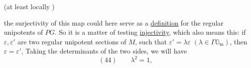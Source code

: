 (at least locally   )

the surjectivity of this map could here serve as a \uline{definition} for the regular unipotents of $PG$. So it is a matter of testing \uline{injectivity}, which also means  this: if $\varepsilon,\varepsilon'$ are two regular unipotent sections of $M$, such that  $\varepsilon'=\lambda\varepsilon$ $(\lambda\in\Gamma\mathbb G_{\mathrm m})$, then $\varepsilon=\varepsilon'$,  Taking the determinants of the two sides, we will have
\[
(44)\qquad\lambda^2=1,
\]

